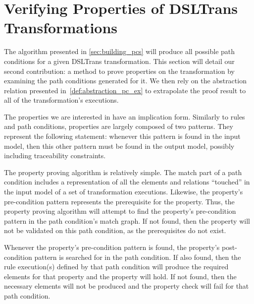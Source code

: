 \section{Verifying Properties of DSLTrans Transformations}
\label{sec:verif_dsltrans_props}


The algorithm presented in \cref{sec:building_pcs} will produce all possible
path conditions for a given DSLTrans transformation. This section will detail
our second contribution: a method to prove properties on the transformation by
examining the path conditions generated for it. We then rely on the abstraction
relation presented in~\cref{def:abstraction_pc_ex} to extrapolate the proof
result to all of the transformation's executions.

The properties we are interested in have an implication form. Similarly to rules and path conditions, properties are largely composed of two patterns. They represent the following statement: whenever this pattern is found in the input model, then
this other pattern must be found in the output model, possibly including traceability constraints.

The property proving algorithm is relatively simple. The match part of a path condition
includes a representation of all the elements and relations ``touched'' in the input model of a set of transformation executions. Likewise, the property's pre-condition pattern represents the prerequisite for the property. Thus, the
property proving algorithm will attempt to find the property's pre-condition pattern in the path condition's match graph. If not found, then the property will not be validated on this path condition, as the prerequisites do not exist.

Whenever the property's pre-condition pattern is found, the property's
post-condition pattern is searched for in the path condition. If
also found, then the rule execution(s) defined by that path condition will produce
the required elements for that property and the property will hold. If not
found, then the necessary elements will not be produced and the property check
will fail for that path condition.


